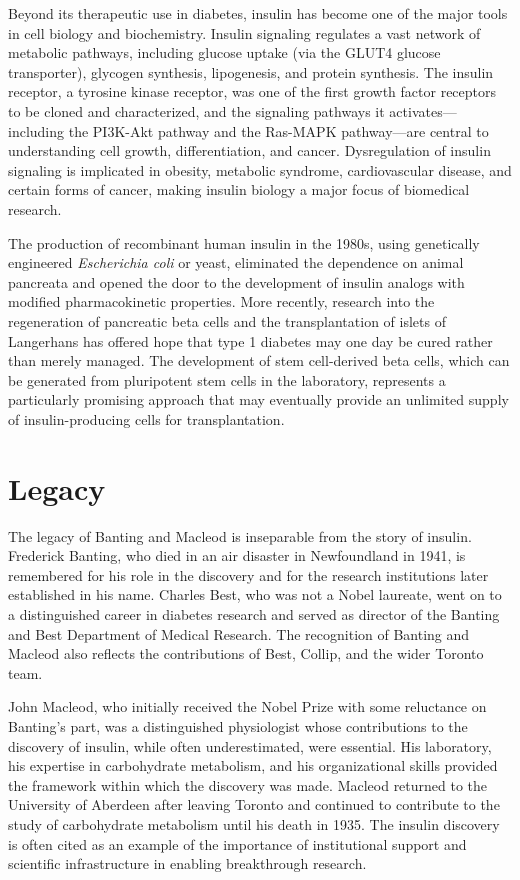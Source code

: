 Beyond its therapeutic use in diabetes, insulin has become one of the major tools in cell biology and biochemistry. Insulin signaling regulates a vast network of metabolic pathways, including glucose uptake (via the GLUT4 glucose transporter), glycogen synthesis, lipogenesis, and protein synthesis. The insulin receptor, a tyrosine kinase receptor, was one of the first growth factor receptors to be cloned and characterized, and the signaling pathways it activates---including the PI3K-Akt pathway and the Ras-MAPK pathway---are central to understanding cell growth, differentiation, and cancer. Dysregulation of insulin signaling is implicated in obesity, metabolic syndrome, cardiovascular disease, and certain forms of cancer, making insulin biology a major focus of biomedical research.

The production of recombinant human insulin in the 1980s, using genetically engineered \emph{Escherichia coli} or yeast, eliminated the dependence on animal pancreata and opened the door to the development of insulin analogs with modified pharmacokinetic properties. More recently, research into the regeneration of pancreatic beta cells and the transplantation of islets of Langerhans has offered hope that type 1 diabetes may one day be cured rather than merely managed. The development of stem cell-derived beta cells, which can be generated from pluripotent stem cells in the laboratory, represents a particularly promising approach that may eventually provide an unlimited supply of insulin-producing cells for transplantation.

\section{Legacy}

The legacy of Banting and Macleod is inseparable from the story of insulin. Frederick Banting, who died in an air disaster in Newfoundland in 1941, is remembered for his role in the discovery and for the research institutions later established in his name. Charles Best, who was not a Nobel laureate, went on to a distinguished career in diabetes research and served as director of the Banting and Best Department of Medical Research. The recognition of Banting and Macleod also reflects the contributions of Best, Collip, and the wider Toronto team.\cite{banting-biographical,insulin-history}

John Macleod, who initially received the Nobel Prize with some reluctance on Banting's part, was a distinguished physiologist whose contributions to the discovery of insulin, while often underestimated, were essential. His laboratory, his expertise in carbohydrate metabolism, and his organizational skills provided the framework within which the discovery was made. Macleod returned to the University of Aberdeen after leaving Toronto and continued to contribute to the study of carbohydrate metabolism until his death in 1935. The insulin discovery is often cited as an example of the importance of institutional support and scientific infrastructure in enabling breakthrough research.

